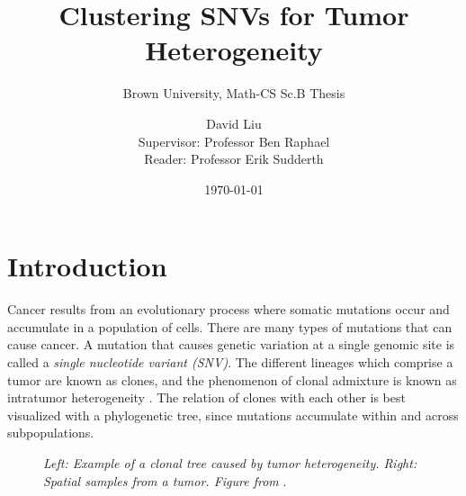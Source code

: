 \documentclass[11pt]{article}
\title{\vspace{2in}Clustering SNVs for Tumor Heterogeneity}
\subtitle{Brown University, Math-CS Sc.B Thesis}
\date{ \vspace{1.0in} \today}
\author{David Liu \vspace{1.5in}\\ Supervisor: Professor Ben Raphael \\[20pt] Reader: Professor Erik Sudderth}
\begin{document}
\maketitle
\newpage
\tableofcontents
\section{Introduction}
Cancer results from an evolutionary process where somatic mutations occur and accumulate in a population of cells. There are many types of mutations that can cause cancer. A mutation that causes genetic variation at a single genomic site is called a \emph{single nucleotide variant (SNV)}. The different lineages which comprise a tumor are known as clones, and the phenomenon of clonal admixture is known as intratumor heterogeneity \cite{Nowell1976}. The relation of clones with each other is best visualized with a phylogenetic tree, since mutations accumulate within and across subpopulations.

\begin{figure}[h]
\par
{}%
\hspace{0.5in}
%
\par
\caption{\emph{Left: Example of a clonal tree caused by tumor heterogeneity. Right: Spatial samples from a tumor. Figure from} \cite{Ancestree}.}
\label{fig:Heterogeneity}
\end{figure}
\end{document}
